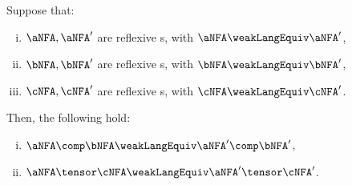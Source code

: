 \begin{theorem}\label{thm:weakLangEquivCongruence}

    Suppose that:
    \begin{enumerate}[(i)]
        \item $\aNFA, \aNFA'$ are reflexive \NFAB{\aN}{\bN}s, with $\aNFA \weakLangEquiv \aNFA'$,
        \item $\bNFA, \bNFA'$ are reflexive \NFAB{\bN}{\cN}s, with $\bNFA \weakLangEquiv \bNFA'$,
        \item $\cNFA, \cNFA'$ are reflexive \NFAB{\cN}{\dN}s, with $\cNFA \weakLangEquiv \cNFA'$.
    \end{enumerate}
    Then, the following hold:
\begin{enumerate}[(i)]
    \item \label{weakLangEquivItem1} $\aNFA \comp \bNFA \weakLangEquiv \aNFA'
    \comp \bNFA'$, \item \label{weakLangEquivItem2} $\aNFA \tensor \cNFA
        \weakLangEquiv \aNFA' \tensor \cNFA'$.
\end{enumerate}
\end{theorem}
